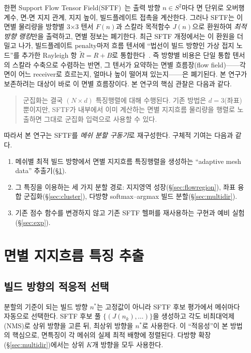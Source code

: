 \documentclass[11pt,a4paper]{article}
\begin{document}
한편 Support Flow Tensor Field(SFTF)~\cite{sftf}는 출력 방향 $n\in S^2$마다
면 단위로 오버행 계수, 면-면 지지 관계, 지지 높이, 빌드플레이트 접촉을 계산한다.
그러나 SFTF는 이 면별 물리량을 방향별 3$\times$3 텐서 $F(n)$과
스칼라 목적함수 $J(n)$으로 환원하여 \emph{최적 방향 랭킹}만을 출력하고,
면별 정보는 폐기한다.
최근 SFTF 개정에서는 이 환원을 더 밀고 나가, 빌드플레이트 penalty마저 흐름 텐서에
``법선이 빌드 방향인 가상 접지 노드''를 추가한 Rayleigh 항 $\tilde R=R+B$로 통합한다~\cite{sftf}.
즉 방향별 비용은 단일 통합 텐서의 스칼라 수축으로 수렴하는 반면,
그 텐서가 요약하는 면별 흐름장(flow field)——각 면이 어느 receiver로 흐르는지, 얼마나 높이 떨어져 있는지——은 폐기된다.
본 연구가 보존하려는 대상이 바로 이 면별 흐름장이다.
본 연구의 핵심 관찰은 다음과 같다.

\begin{quote}
군집화는 결국 $(N\times d)$ 특징행렬에 대해 수행된다.
기존 방법은 $d=3$(좌표)뿐이지만,
SFTF가 내부에서 이미 계산하는 면별 지지흐름 물리량을 행렬로 노출하면
그대로 군집화 입력으로 사용할 수 있다.
\end{quote}

따라서 본 연구는 SFTF를 \emph{메쉬 분할 구동기}로 재구성한다.
구체적 기여는 다음과 같다.
\begin{enumerate}
\item 메쉬별 최적 빌드 방향에서 면별 지지흐름 특징행렬을 생성하는
``adaptive mesh data'' 추출기(\S\ref{sec:features}).
\item 그 특징을 이용하는 세 가지 분할 경로:
지지영역 성장(\S\ref{sec:flowregion}),
좌표 융합 군집화(\S\ref{sec:cluster}),
다방향 softmax--argmax 빌드 분할(\S\ref{sec:multidir}).
\item 기존 점수 함수를 변경하지 않고 기존 SFTF 헬퍼를 재사용하는 구현과
예비 실험(\S\ref{sec:exp}).
\end{enumerate}

\section{면별 지지흐름 특징 추출}
\label{sec:features}

\subsection{빌드 방향의 적응적 선택}

분할의 기준이 되는 빌드 방향 $n^\ast$는 고정값이 아니라
SFTF 후보 평가에서 메쉬마다 자동으로 선택한다.
SFTF 후보 풀 $\{(J(n_k),\dots)\}$을 생성하고 각도 비최대억제(NMS)로
상위 방향을 고른 뒤, 최상위 방향을 $n^\ast$로 사용한다.
이 ``적응성''이 본 방법의 핵심으로,
면특징이 각 메쉬의 실제 최적 배향에 정렬된다.
다방향 확장(\S\ref{sec:multidir})에서는 상위 $K$개 방향을 모두 사용한다.
\end{document}
